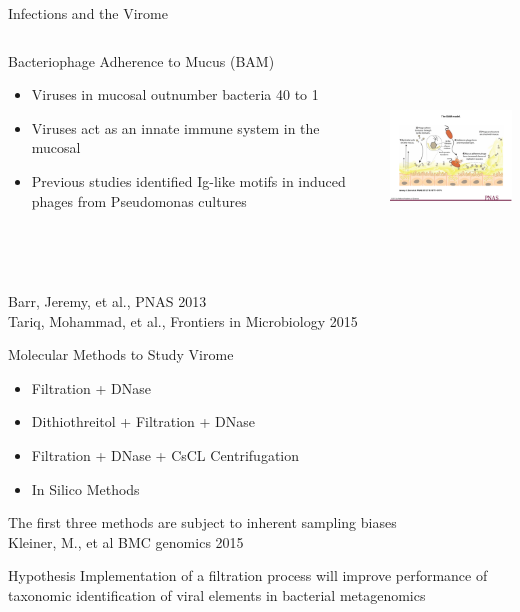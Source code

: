 \documentclass[11pt]{beamer}
\begin{document}
	
	\begin{frame}{Infections and the Virome}
	\begin{columns}
	\begin{block}{Bacteriophage Adherence to Mucus (BAM)}
	\begin{itemize}
	\item Viruses in mucosal outnumber bacteria 40 to 1
	\item Viruses act as an innate immune system in the mucosal
	\item Previous studies identified Ig-like motifs in induced phages from Pseudomonas cultures
	\end{itemize}
	\end{block}
	\includegraphics[height=5.5cm, width=5cm]{barr.png}
	\end{columns}
	\tiny{Barr, Jeremy, et al., PNAS 2013 \\ Tariq, Mohammad, et al., Frontiers in Microbiology 2015}
	\end{frame}
	
	\begin{frame}{Molecular Methods to Study Virome}
		\begin{itemize}
		\item Filtration + DNase
		\item Dithiothreitol + Filtration + DNase
		\item Filtration + DNase + CsCL Centrifugation
		\item \alert{In Silico Methods}
		\end{itemize}
		
	The first three methods are subject to inherent sampling biases \\ \tiny{Kleiner, M., et al BMC genomics 2015}
	\end{frame}

	
	\begin{frame}{Hypothesis}
	Implementation of a filtration process will improve performance of taxonomic identification of viral elements in bacterial metagenomics
	\end{frame}
	
\end{document}
